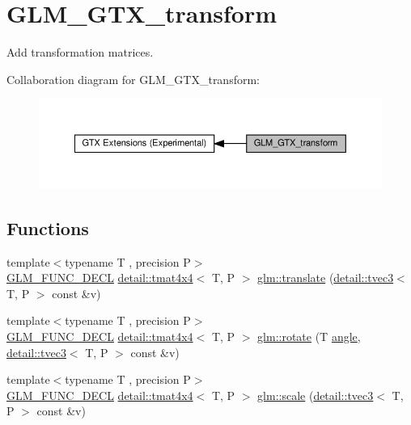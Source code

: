 \hypertarget{group__gtx__transform}{}\section{G\+L\+M\+\_\+\+G\+T\+X\+\_\+transform}
\label{group__gtx__transform}


Add transformation matrices.  


Collaboration diagram for G\+L\+M\+\_\+\+G\+T\+X\+\_\+transform\+:\nopagebreak
\begin{figure}[H]
\begin{center}
\leavevmode
\includegraphics[width=350pt]{group__gtx__transform}
\end{center}
\end{figure}
\subsection*{Functions}
\begin{DoxyCompactItemize}
\item 
{\footnotesize template$<$typename T , precision P$>$ }\\\hyperlink{setup_8hpp_ab2d052de21a70539923e9bcbf6e83a51}{G\+L\+M\+\_\+\+F\+U\+N\+C\+\_\+\+D\+E\+CL} \hyperlink{structglm_1_1detail_1_1tmat4x4}{detail\+::tmat4x4}$<$ T, P $>$ \hyperlink{group__gtx__transform_ga8a2efce0917bf301cc0ea7afb428f688}{glm\+::translate} (\hyperlink{structglm_1_1detail_1_1tvec3}{detail\+::tvec3}$<$ T, P $>$ const \&v)
\item 
{\footnotesize template$<$typename T , precision P$>$ }\\\hyperlink{setup_8hpp_ab2d052de21a70539923e9bcbf6e83a51}{G\+L\+M\+\_\+\+F\+U\+N\+C\+\_\+\+D\+E\+CL} \hyperlink{structglm_1_1detail_1_1tmat4x4}{detail\+::tmat4x4}$<$ T, P $>$ \hyperlink{group__gtx__transform_gaac4ccdbf699a62fe6429005512c0cda5}{glm\+::rotate} (T \hyperlink{group__gtc__quaternion_ga23a3fc7ada5bbb665ff84c92c6e0542c}{angle}, \hyperlink{structglm_1_1detail_1_1tvec3}{detail\+::tvec3}$<$ T, P $>$ const \&v)
\item 
{\footnotesize template$<$typename T , precision P$>$ }\\\hyperlink{setup_8hpp_ab2d052de21a70539923e9bcbf6e83a51}{G\+L\+M\+\_\+\+F\+U\+N\+C\+\_\+\+D\+E\+CL} \hyperlink{structglm_1_1detail_1_1tmat4x4}{detail\+::tmat4x4}$<$ T, P $>$ \hyperlink{group__gtx__transform_ga80eb26a1eb382b7ab1e3631532d21103}{glm\+::scale} (\hyperlink{structglm_1_1detail_1_1tvec3}{detail\+::tvec3}$<$ T, P $>$ const \&v)
\end{DoxyCompactItemize}


